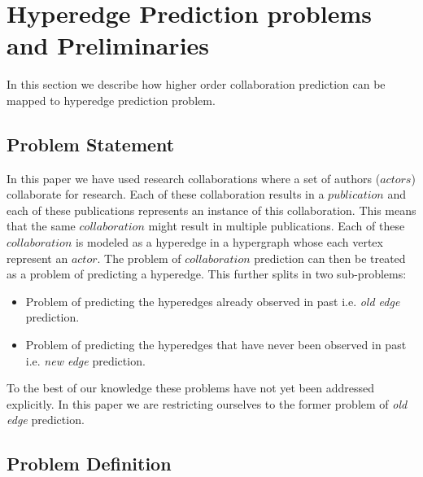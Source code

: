 \documentclass[twoside,leqno,twocolumn]{article}
\begin{document}
\section{Hyperedge Prediction problems and Preliminaries}

In this section we describe how higher order collaboration prediction can be mapped to hyperedge prediction problem. 

\subsection{Problem Statement}

In this paper we have used research collaborations where a set of authors ($actors$) collaborate for research. Each of these collaboration results in a $publication$ and each of these publications represents an instance of this collaboration. This means that the same $collaboration$ might result in multiple publications. Each of these $collaboration$ is modeled as a hyperedge in a hypergraph whose each vertex represent an $actor$. The problem of $collaboration$ prediction can then be treated as a problem of predicting a hyperedge. This further splits in two sub-problems: 

\begin{itemize}
\item Problem of predicting the hyperedges already observed in past i.e. \textit{old edge} prediction.
\item Problem of predicting the hyperedges that have never been observed in past i.e. \textit{new edge} prediction. 
\end{itemize} 

To the best of our knowledge these problems have not yet been addressed explicitly. In this paper we are restricting ourselves to the former problem of \textit{old edge} prediction. 

\subsection{Problem Definition}
\end{document}
